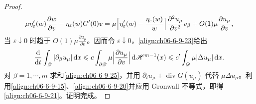 \documentclass[../../main.tex]{subfiles}
\begin{document}
\begin{proof}
\begin{align}
\mu\eta_{\varepsilon}^{\prime}(w)\frac{\partial w}{\partial v}-\eta_{\varepsilon}(w)G^{\prime}(0)v
=\mu\Bigl{[}\eta_{\varepsilon}^{\prime}(w)-\frac{\eta_{\varepsilon}(w)}{w}\Bigr{]}\frac{\partial^{2}u_{\mu}}{\partial v^{2}}v_{\beta}+O(1)\mu\frac{\partial u_{\mu}}{\partial v},
\label{align:ch06-6-9-24}
\end{align}
当 $\varepsilon\downarrow 0$ 时趋于 $O(1)\mu\frac{\partial u_{\mu}}{\partial v}$。因而令 $\varepsilon\downarrow 0$，\eqref{align:ch06-6-9-23}给出
\begin{align}
\frac{\mathrm{d}}{\mathrm{d}t}\int_{\mathscr{D}}|\partial_{\beta}u_{\mu}|\,\mathrm{d}x\leqslant c\int_{\partial\mathscr{D}}\mu\Bigl{|}\frac{\partial u_{\mu}}{\partial v}\Bigr{|}\,\mathrm{d}\mathscr{H}^{m-1}(x)\leqslant c^{\prime}\int_{\mathscr{D}}\mu|\Delta u_{\mu}|\,\mathrm{d}x.
\label{align:ch06-6-9-25}
\end{align}
对 $\beta=1,\cdots,m$ 求和\eqref{align:ch06-6-9-25}，并用 $\partial_{t}u_{\mu}+\operatorname{div}G(u_{\mu})$ 代替 $\mu\Delta u_{\mu}$。利用\eqref{align:ch06-6-9-15}、\eqref{align:ch06-6-9-20}并应用 Gronwall 不等式，即得\eqref{align:ch06-6-9-21}。证明完成。
\end{proof}
\end{document}
